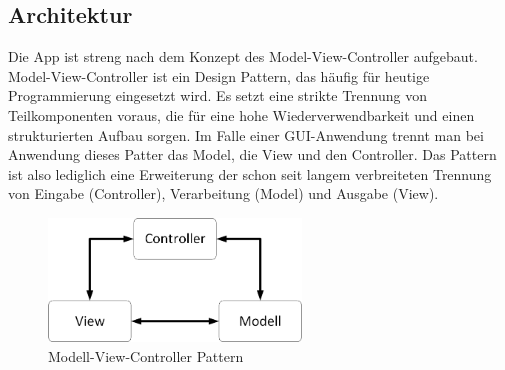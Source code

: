 \subsection{Architektur}
Die App ist streng nach dem Konzept des Model-View-Controller aufgebaut.
\\
Model-View-Controller ist ein Design Pattern, das häufig für heutige Programmierung eingesetzt wird. Es setzt eine strikte Trennung von Teilkomponenten voraus, die für eine hohe Wiederverwendbarkeit und einen strukturierten Aufbau sorgen. Im Falle einer GUI-Anwendung trennt man bei Anwendung dieses Patter das Model, die View und den Controller. Das Pattern ist also lediglich eine Erweiterung der schon seit langem verbreiteten Trennung von Eingabe (Controller), Verarbeitung (Model) und Ausgabe (View). 

\begin{figure}[h]
\centering
\includegraphics[width=0.6\textwidth]{ref/images/mvc.png}
\caption[Modell-View-Controller Pattern]{Modell-View-Controller Pattern}
\label{fig:MVC}
\end{figure} 

